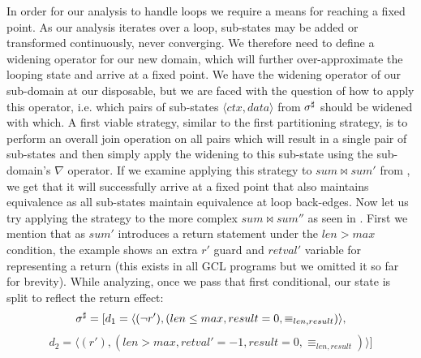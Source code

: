 In order for our analysis to handle loops we require a means for reaching a fixed point. As our analysis iterates over a loop, sub-states may be added or transformed continuously, never converging. We therefore need to define a widening operator for our new domain, which will further over-approximate the looping state and arrive at a fixed point. We have the widening operator of our sub-domain at our disposable, but we are faced with the question of how to apply this operator, i.e. which pairs of sub-states $\langle ctx , data \rangle$ from $\sigma^\sharp$ should be widened with which. A first viable strategy, similar to the first partitioning strategy, is to perform an overall join operation on all pairs which will result in a single pair of sub-states and then simply apply the widening to this sub-state using the sub-domain's $\nabla$ operator. If we examine applying this strategy to $sum \bowtie sum'$ from , we get that it will successfully arrive at a fixed point that also maintains equivalence as all sub-states maintain equivalence at loop back-edges. Now let us try applying the strategy to the more complex $sum \bowtie sum''$ as seen in . First we mention that as $sum'$ introduces a return statement under the $len > max$ condition, the example shows an extra $r'$ guard and $retval'$ variable for representing a return (this exists in all GCL programs but we omitted it so far for brevity). While analyzing, once we pass that first conditional, our state is split to reflect the return effect:
{\footnotesize
\[
\sigma^\sharp = [ d_1 = \langle (\neg r'),(len \leq max, result = 0, \equiv_{len,result}) \rangle,
\]
\[
d_2 = \langle (r'),(len > max, retval' = -1, result = 0, \equiv_{len,result}) \rangle ]
\]
}

